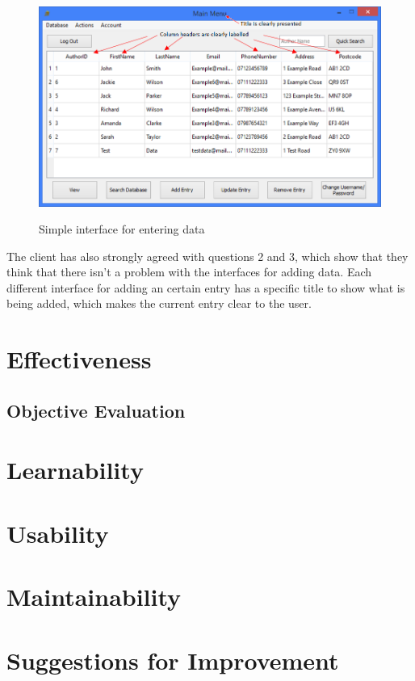 \begin{figure}[H]
    \includegraphics[width=\textwidth]{./Evaluation/Evidence/Clarity.png}
    \label{fig:AddingInterface} \caption{Simple interface for entering data}
\end{figure}

The client has also strongly agreed with questions 2 and 3, which show that they think that there isn't a problem with the interfaces for adding data. Each different interface for adding an certain entry has a specific title to show what is being added, which makes the current entry clear to the user.

\section{Effectiveness}

\subsection{Objective Evaluation}

\section{Learnability}

\section{Usability}

\section{Maintainability}

\section{Suggestions for Improvement}

